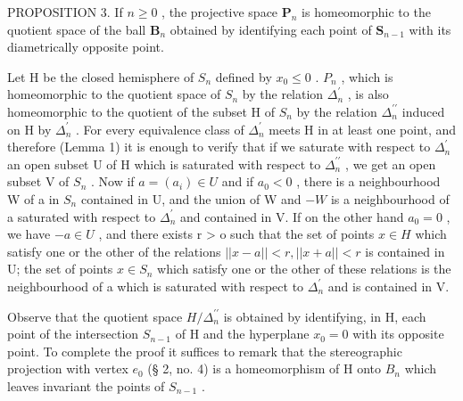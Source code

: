 PROPOSITION 3. If \(n \geqslant 0\) , the projective space \(\mathbf{P}_n\) is homeomorphic to the quotient space of the ball \(\mathbf{B}_n\) obtained by identifying each point of \(\mathbf{S}_{n-1}\) with its diametrically opposite point.

Let H be the closed hemisphere of \(S_{n}\) defined by \(x_{0} \leqslant 0\) . \(P_{n}\) , which is homeomorphic to the quotient space of \(S_{n}\) by the relation \(\Delta_{n}^{\prime}\) , is also homeomorphic to the quotient of the subset H of \(S_{n}\) by the relation \(\Delta_{n}^{\prime\prime}\) induced on H by \(\Delta_{n}^{\prime}\) . For every equivalence class of \(\Delta_{n}^{\prime}\) meets H in at least one point, and therefore (Lemma 1) it is enough to verify that if we saturate with respect to \(\Delta_{n}^{\prime}\) an open subset U of H which is saturated with respect to \(\Delta_{n}^{\prime\prime}\) , we get an open subset V of \(S_{n}\) . Now if \(a = (a_{i}) \in U\) and if \(a_{0} < 0\) , there is a neighbourhood W of a in \(S_{n}\) contained in U, and the union of W and \(-W\) is a neighbourhood of a saturated with respect to \(\Delta_{n}^{\prime}\) and contained in V. If on the other hand \(a_{0} = 0\) , we have \(- a \in U\) , and there exists r \textgreater{} o such that the set of points \(x \in H\) which satisfy one or the other of the relations \(||x-a||<r, ||x+a||<r\) is contained in U; the set of points \(x\in S_{n}\) which satisfy one or the other of these relations is the neighbourhood of a which is saturated with respect to \(\Delta_{n}^{\prime}\) and is contained in V.

Observe that the quotient space \(H/\Delta_{n}^{\prime\prime}\) is obtained by identifying, in H, each point of the intersection \(S_{n-1}\) of H and the hyperplane \(x_{0}=0\) with its opposite point. To complete the proof it suffices to remark that the stereographic projection with vertex \(e_{0}\) (§ 2, no. 4) is a homeomorphism of H onto \(B_{n}\) which leaves invariant the points of \(S_{n-1}\) .


